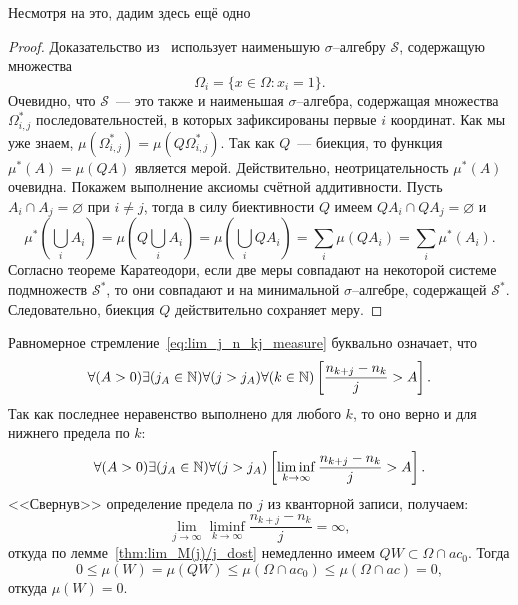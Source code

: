 Несмотря на это, дадим здесь ещё одно
\begin{proof}
	Доказательство из~\cite{connor1990almost} использует наименьшую $\sigma$--алгебру $\mathcal{S}$,
	содержащую множества
	\begin{equation}
		\Omega_i = \{x\in\Omega: x_i = 1\}
		.
	\end{equation}
	Очевидно, что $\mathcal{S}$~--- это также и наименьшая $\sigma$--алгебра, содержащая множества
	$\Omega^*_{i,j}$ последовательностей, в которых зафиксированы первые $i$ координат.
	Как мы уже знаем, $\mu(\Omega^*_{i,j}) = \mu(Q\Omega^*_{i,j})$.
	Так как $Q$~--- биекция, то функция $\mu^*(A) = \mu(QA)$ является мерой.
	Действительно, неотрицательность $\mu^*(A)$ очевидна.
	Покажем выполнение аксиомы счётной аддитивности.
	Пусть $A_i \cap A_j = \varnothing$ при $i\neq j$,
	тогда в силу биективности $Q$ имеем $QA_i \cap QA_j = \varnothing$ и
	\begin{equation}
		\mu^*\left( \bigcup_i A_i \right)
		=
		\mu\left( Q \bigcup_i A_i \right)
		=
		\mu\left( \bigcup_i QA_i \right)
		=
		\sum_i 	\mu( QA_i )
		=
		\sum_i 	\mu^*( A_i )
		.
	\end{equation}
	Согласно теореме Каратеодори,
	если две меры совпадают на некоторой системе подмножеств $\mathcal{S}^*$,
	то они совпадают и на минимальной $\sigma$--алгебре, содержащей $\mathcal{S}^*$.
	Следовательно, биекция $Q$ действительно сохраняет меру.
\end{proof}


Равномерное стремление~\eqref{eq:lim_j_n_kj_measure}
буквально означает, что
\begin{equation}
	\forall(A>0)\exists(j_A\in\mathbb{N})\forall(j > j_A)\forall(k\in\mathbb{N})
	\left[
		\frac{n_{k+j}-n_k}{j}>A
	\right]
	.
\end{equation}
Так как последнее неравенство выполнено для любого $k$,
то оно верно и для нижнего предела по $k$:
\begin{equation}
	\forall(A>0)\exists(j_A\in\mathbb{N})\forall(j > j_A)
	\left[
		\liminf_{k\to\infty}\frac{n_{k+j}-n_k}{j}>A
	\right]
	.
\end{equation}
<<Свернув>> определение предела по $j$ из кванторной записи, получаем:
\begin{equation}
	\lim_{j\to\infty}\liminf_{k\to\infty}\frac{n_{k+j}-n_k}{j} = \infty
	,
\end{equation}
откуда по лемме~\ref{thm:lim_M(j)/j_dost} немедленно имеем $QW \subset \Omega\cap ac_0$.
Тогда
\begin{equation}
	0 \leq \mu(W) = \mu(QW) \leq \mu(\Omega\cap ac_0) \leq \mu(\Omega\cap ac) = 0
	,
\end{equation}
откуда $\mu(W)=0$.

